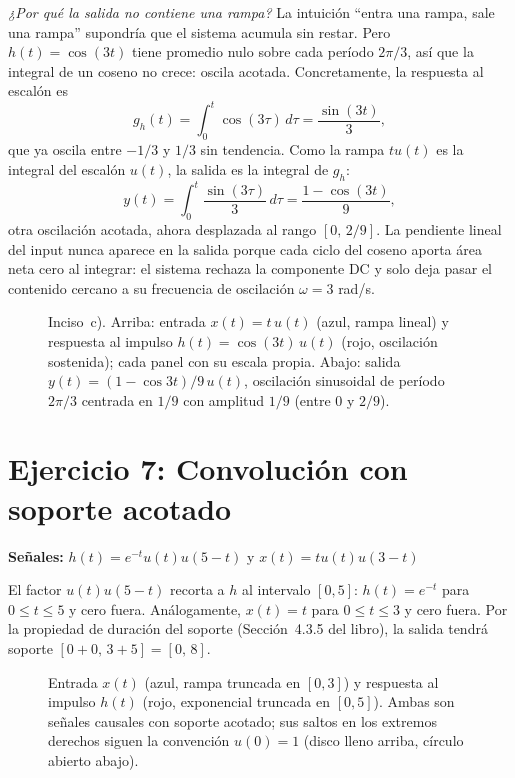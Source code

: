 \documentclass[10pt,a4paper]{article}
\begin{document}
\begin{enumerate}[label=\textbf{\alph*)}]
		\textit{¿Por qué la salida no contiene una rampa?} La intuición ``entra una rampa, sale una rampa'' supondría que el sistema acumula sin restar. Pero $h(t) = \cos(3t)$ tiene promedio nulo sobre cada período $2\pi/3$, así que la integral de un coseno no crece: oscila acotada. Concretamente, la respuesta al escalón es
		\[
		g_h(t) = \int_0^t \cos(3\tau)\,d\tau = \frac{\sin(3t)}{3},
\]
		que ya oscila entre $-1/3$ y $1/3$ sin tendencia. Como la rampa $tu(t)$ es la integral del escalón $u(t)$, la salida es la integral de $g_h$:
		\[
		y(t) = \int_0^t \frac{\sin(3\tau)}{3}\,d\tau = \frac{1-\cos(3t)}{9},
\]
		otra oscilación acotada, ahora desplazada al rango $[0,\, 2/9]$. La pendiente lineal del input nunca aparece en la salida porque cada ciclo del coseno aporta área neta cero al integrar: el sistema rechaza la componente DC y solo deja pasar el contenido cercano a su frecuencia de oscilación $\omega = 3$ rad/s.

		\begin{figure}[H]
		\centering
		
		\caption{Inciso~c). Arriba: entrada $x(t) = t\,u(t)$ (azul, rampa lineal) y respuesta al impulso $h(t) = \cos(3t)\,u(t)$ (rojo, oscilación sostenida); cada panel con su escala propia. Abajo: salida $y(t) = (1-\cos 3t)/9\,u(t)$, oscilación sinusoidal de período $2\pi/3$ centrada en $1/9$ con amplitud $1/9$ (entre $0$ y $2/9$).}
		\end{figure}
	\end{enumerate}

	\section*{Ejercicio 7: Convolución con soporte acotado}
	
	\textbf{Señales:} $h(t) = e^{-t}u(t)u(5-t)$ y $x(t) = tu(t)u(3-t)$
	
	El factor $u(t)u(5-t)$ recorta a $h$ al intervalo $[0,5]$: $h(t) = e^{-t}$ para $0 \leq t \leq 5$ y cero fuera. Análogamente, $x(t) = t$ para $0 \leq t \leq 3$ y cero fuera. Por la propiedad de duración del soporte (Sección~4.3.5 del libro), la salida tendrá soporte $[0+0,\, 3+5] = [0,\, 8]$.

	\begin{figure}[H]
	\centering
	
	\caption{Entrada $x(t)$ (azul, rampa truncada en $[0,3]$) y respuesta al impulso $h(t)$ (rojo, exponencial truncada en $[0,5]$). Ambas son señales causales con soporte acotado; sus saltos en los extremos derechos siguen la convención $u(0)=1$ (disco lleno arriba, círculo abierto abajo).}
	\end{figure}
\end{document}
